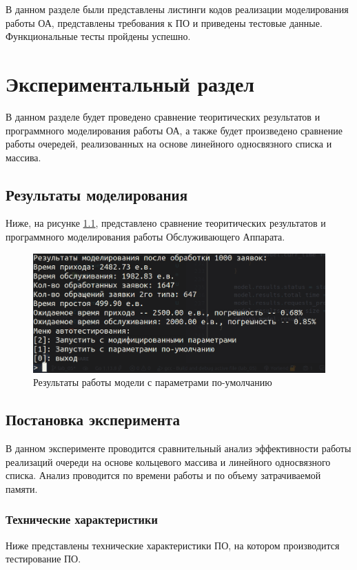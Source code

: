 В данном разделе были представлены листинги кодов реализации моделирования работы ОА, представлены требования к ПО и приведены тестовые данные. Функциональные тесты пройдены успешно.

\chapter{Экспериментальный раздел}

В данном разделе будет проведено сравнение теоритических результатов и программного моделирования работы ОА, а также будет произведено сравнение работы очередей, реализованных на основе линейного односвязного списка и массива.

\section{Результаты моделирования}

Ниже, на рисунке \ref{fig:modelres}, представлено сравнение теоритических результатов и программного моделирования работы Обслуживающего Аппарата.

\begin{figure}
	\centering
	\includegraphics[width=0.7\linewidth]{img/model_res}
	\caption{Результаты работы модели с параметрами по-умолчанию}
	\label{fig:modelres}
\end{figure}

\section{Постановка эксперимента}

В данном эксперименте проводится сравнительный анализ эффективности работы реализаций очереди на основе кольцевого массива и линейного односвязного списка. Анализ проводится по времени работы и по объему затрачиваемой памяти.

\subsection{Технические характеристики}

Ниже представлены технические характеристики ПО, на котором производится тестирование ПО.


